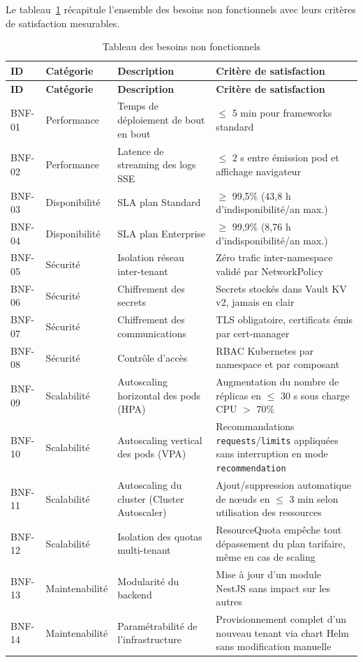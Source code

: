 Le tableau~\ref{tab:besoins-non-fonctionnels} récapitule l'ensemble des besoins non fonctionnels avec leurs critères de satisfaction mesurables.

\small
\setlength{\LTleft}{0pt}
\setlength{\LTright}{0pt}
\renewcommand{\arraystretch}{1.15}
\begin{longtable}{|p{1.1cm}|p{2.3cm}|>{\raggedright\arraybackslash}p{4.8cm}|>{\raggedright\arraybackslash}p{4cm}|}
\caption{Tableau des besoins non fonctionnels}\label{tab:besoins-non-fonctionnels}\\
\hline
\textbf{ID} & \textbf{Catégorie} & \textbf{Description} & \textbf{Critère de satisfaction} \\
\hline
\endfirsthead

\hline
\textbf{ID} & \textbf{Catégorie} & \textbf{Description} & \textbf{Critère de satisfaction} \\
\hline
\endhead

BNF-01 & Performance & Temps de déploiement de bout en bout & $\leq$ 5 min pour frameworks standard \\
\hline
BNF-02 & Performance & Latence de streaming des logs SSE & $\leq$ 2 s entre émission pod et affichage navigateur \\
\hline
BNF-03 & Disponibilité & SLA plan Standard & $\geq$ 99,5\% (43,8 h d'indisponibilité/an max.) \\
\hline
BNF-04 & Disponibilité & SLA plan Enterprise & $\geq$ 99,9\% (8,76 h d'indisponibilité/an max.) \\
\hline
BNF-05 & Sécurité & Isolation réseau inter-tenant & Zéro trafic inter-namespace validé par NetworkPolicy \\
\hline
BNF-06 & Sécurité & Chiffrement des secrets & Secrets stockés dans Vault KV v2, jamais en clair \\
\hline
BNF-07 & Sécurité & Chiffrement des communications & TLS obligatoire, certificats émis par cert-manager \\
\hline
BNF-08 & Sécurité & Contrôle d'accès & RBAC Kubernetes par namespace et par composant \\
\hline
BNF-09 & Scalabilité & Autoscaling horizontal des pods (HPA) & Augmentation du nombre de réplicas en $\leq$ 30 s sous charge CPU $>$ 70\% \\
\hline
BNF-10 & Scalabilité & Autoscaling vertical des pods (VPA) & Recommandations \texttt{requests}/\texttt{limits} appliquées sans interruption en mode \texttt{recommendation} \\
\hline
BNF-11 & Scalabilité & Autoscaling du cluster (Cluster Autoscaler) & Ajout/suppression automatique de nœuds en $\leq$ 3 min selon utilisation des ressources \\
\hline
BNF-12 & Scalabilité & Isolation des quotas multi-tenant & ResourceQuota empêche tout dépassement du plan tarifaire, même en cas de scaling \\
\hline
BNF-13 & Maintenabilité & Modularité du backend & Mise à jour d'un module NestJS sans impact sur les autres \\
\hline
BNF-14 & Maintenabilité & Paramétrabilité de l'infrastructure & Provisionnement complet d'un nouveau tenant via chart Helm sans modification manuelle \\
\hline
\end{longtable}
